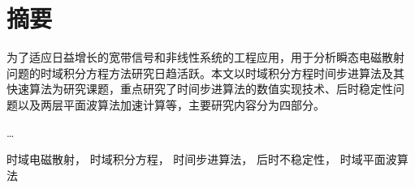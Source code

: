 \chapter*{摘\enspace{}要}

为了适应日益增长的宽带信号和非线性系统的工程应用，用于分析瞬态电磁散射
问题的时域积分方程方法研究日趋活跃。本文以时域积分方程时间步进算法及其
快速算法为研究课题，重点研究了时间步进算法的数值实现技术、后时稳定性问
题以及两层平面波算法加速计算等，主要研究内容分为四部分。

\ldots

\bigskip

%
%
时域电磁散射，
时域积分方程，
时间步进算法，
后时不稳定性，
时域平面波算法
